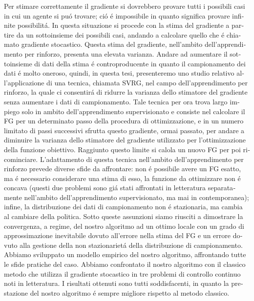\begin{otherlanguage}{italian}
Per stimare correttamente il gradiente si dovrebbero provare tutti i possibili casi in cui un agente si pu\'o trovare; ci\'o \'e impossibile in quanto significa provare infinite possibilit\'a.
In questa situazione si procede con la stima del gradiente a partire da un sottoinsieme dei possibili casi, andando a calcolare quello che \'e chiamato gradiente stocastico.
Questa stima del gradiente, nell'ambito dell'apprendimento per rinforzo, presenta una elevata varianza. 
Andare ad aumentare il sottoinsieme di dati della stima \'e controproducente in quanto il campionamento dei dati \'e molto oneroso, quindi, in questa tesi, presenteremo uno studio relativo all'applicazione di una tecnica, chiamata \acf*{SVRG}, nel campo dell'apprendimento per rinforzo, la quale ci consentir\'a di ridurre la varianza dello stimatore del gradiente senza aumentare i dati di campionamento. Tale tecnica per ora trova largo impiego solo in ambito dell'apprendimento supervisionato e consiste nel calcolare il \acf*{FG} per un determinato passo della procedura di ottimizzazione, e in un numero limitato di passi successivi sfrutta questo gradiente, ormai passato, per andare a diminuire la varianza dello stimatore del gradiente utilizzato per l'ottimizzazione della funzione obiettivo. Raggiunto questo limite si calola un nuovo \acs{FG} per poi ricominciare.\newline
L'adattamento di questa tecnica nell'ambito dell'apprendimento per rinforzo prevede diverse sfide da affrontare: non \'e possibile avere un \acs{FG} esatto, ma \'e necessario considerare una stima di esso, la funzione da ottimizzare non \'e concava (questi due problemi sono gi\'a stati affrontati in letteratura separatamente nell'ambito dell'apprendimento supervisionato, ma mai in contemporanea); infine, la distribuzione dei dati di campionamento non \'e stazionaria, ma cambia al cambiare della politica. \newline
Sotto queste assunzioni siamo riusciti a dimostrare la convergenza, a regime, del nostro algoritmo ad un ottimo locale con un grado di approssimazione inevitabile dovuto all'errore nella stima del \acs{FG} e un errore dovuto alla gestione della non stazionariet\'a della distribuzione di campionamento.\newline
Abbiamo sviluppato un modello empirico del nostro algoritmo, affrontando tutte le sfide pratiche del caso. Abbiamo confrontato il nostro algoritmo con il classico metodo che utilizza il gradiente stocastico in tre problemi di controllo continuo noti in letteratura. I risultati ottenuti sono tutti soddisfacenti, in quanto la prestazione del nostro algoritmo \'e sempre migliore rispetto al metodo classico. \newline
\end{otherlanguage}

\endgroup

